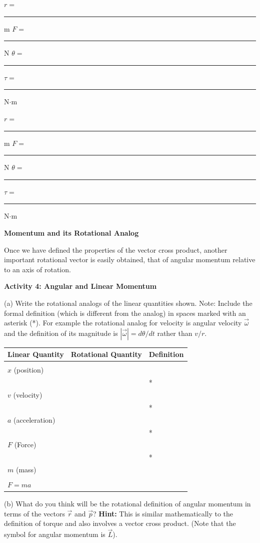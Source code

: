 $r =$ \rule{0.5in}{0.1pt} m \hfill{}$F =$ 
\rule{0.5in}{0.1pt} N \hfill{}\( \theta  =\)
 \rule{0.5in}{0.1pt} \hfill{}\( \tau  =\)  \rule{0.5in}{0.1pt} N\( \cdot  \)m 
\vspace{5mm}

$r = $\rule{0.5in}{0.1pt} m \hfill{}$F =$ \rule{0.5in}{0.1pt} N \hfill{}
\( \theta = \)
\rule{0.5in}{0.1pt} \hfill{}\( \tau  =\)  \rule{0.5in}{0.1pt} N\( \cdot  \)m
\vspace{5mm}

\textbf{Momentum and its Rotational Analog} 

Once we have defined the properties of the vector cross product, another important
rotational vector is easily obtained, that of angular momentum relative to an
axis of rotation. 

\textbf{Activity 4: Angular and Linear Momentum }

(a) Write the rotational analogs of the linear quantities shown. Note: Include
the formal definition (which is different from the analog) in spaces marked
with an asterisk ({*}). For example the rotational analog for velocity is angular velocity \( \vec{\omega}  \) and the definition of its magnitude is \( |
\vec{\omega}  |
= d \theta  /dt\) rather than $v/r$.

\vspace{0.3cm}
{\centering \begin{tabular}{|p{5cm}|p{5cm}|p{5cm}|}
\hline 
Linear Quantity&
Rotational Quantity&
Definition\\
\hline 
\hline 
&
&
\\
$x$ (position) &
&
\\
\hline 
&
&
{*}\\
$v$ (velocity) &
&
\\
\hline 
&
&
{*}\\
$a$ (acceleration) &
&
\\
\hline 
&
&
{*}\\
$F$ (Force) &
&
\\
\hline 
&
&
{*}\\
$m$ (mass) &
&
\\
\hline 
&
&
\\
$F = ma$&
&
\\
\hline 
\end{tabular}\par}
\vspace{0.3cm}

(b) What do you think will be the rotational definition of angular momentum
in terms of the vectors \( {\vec  r} \) and \( {\vec  p} \)?
\textbf{Hint:} This is similar mathematically to the definition of torque and
also involves a vector cross product. (Note that the symbol for angular momentum is $\vec{L}$).
\answerspace{20mm}

